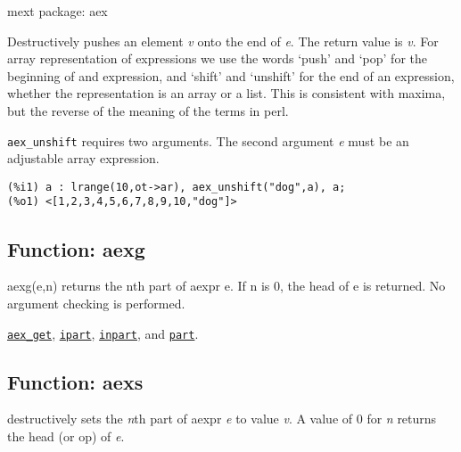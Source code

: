 \documentclass[]{article}
\begin{document}
\noindent mext package: aex



\vspace{5 pt}
Destructively pushes an element {\it v} onto the end of {\it e}. The return value is {\it v}. For array representation of expressions we use the words `push' and `pop' for the beginning of and expression, and `shift' and `unshift' for the end of an expression, whether the representation is an array 
or a list. This is consistent with maxima, but the reverse of the meaning of the terms in perl. 

\vspace{5 pt}

   {\tt aex\_unshift} requires two arguments.
    The second argument {\it e} must be an adjustable array expression.


\vspace{5 pt}


\begin{Verbatim}[frame=single]
(%i1) a : lrange(10,ot->ar), aex_unshift("dog",a), a;
(%o1) <[1,2,3,4,5,6,7,8,9,10,"dog"]>
\end{Verbatim}


\subsection{Function: aexg\label{sec:aexg}}
\hypertarget{aexg}{}



\vspace{5 pt}
aexg(e,n) returns the nth part of aexpr e. If n is 0, the head of e is returned. No argument checking is performed. 

\vspace{5 pt}


  \hyperlink{aex_get}{{\tt aex\_get}}, \hyperlink{ipart}{{\tt ipart}}, \hyperlink{inpart}{{\tt inpart}}, and \hyperlink{part}{{\tt part}}.

\vspace{5 pt}


\subsection{Function: aexs\label{sec:aexs}}
\hypertarget{aexs}{}



\vspace{5 pt}
destructively sets the {\it n}th part of aexpr {\it e} to value {\it v}. A value of $0$ for {\it n} returns the head (or op) of {\it e}. 
\end{document}
